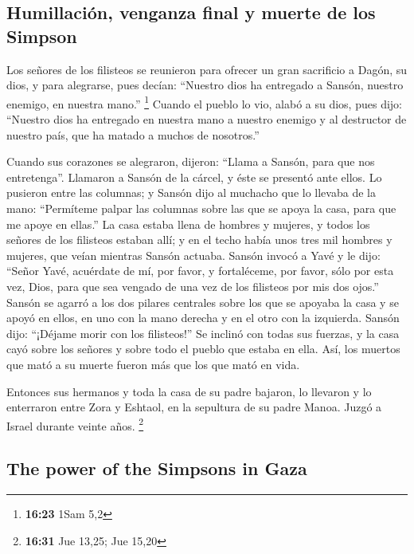 \begin{paracol}{2}
\hypertarget{humillaciuxf3n-venganza-final-y-muerte-de-los-simpson}{%
\subsection{Humillación, venganza final y muerte de los
Simpson}\label{humillaciuxf3n-venganza-final-y-muerte-de-los-simpson}}

 Los señores de los filisteos se reunieron para ofrecer
un gran sacrificio a Dagón, su dios, y para alegrarse, pues decían:
``Nuestro dios ha entregado a Sansón, nuestro enemigo, en nuestra
mano.'' \footnote{\textbf{16:23} 1Sam 5,2}  Cuando el
pueblo lo vio, alabó a su dios, pues dijo: ``Nuestro dios ha entregado
en nuestra mano a nuestro enemigo y al destructor de nuestro país, que
ha matado a muchos de nosotros.''

 Cuando sus corazones se alegraron, dijeron: ``Llama a
Sansón, para que nos entretenga''. Llamaron a Sansón de la cárcel, y
éste se presentó ante ellos. Lo pusieron entre las columnas;
 y Sansón dijo al muchacho que lo llevaba de la mano:
``Permíteme palpar las columnas sobre las que se apoya la casa, para que
me apoye en ellas.''  La casa estaba llena de hombres y
mujeres, y todos los señores de los filisteos estaban allí; y en el
techo había unos tres mil hombres y mujeres, que veían mientras Sansón
actuaba.  Sansón invocó a Yavé y le dijo: ``Señor Yavé,
acuérdate de mí, por favor, y fortaléceme, por favor, sólo por esta vez,
Dios, para que sea vengado de una vez de los filisteos por mis dos
ojos.''  Sansón se agarró a los dos pilares centrales
sobre los que se apoyaba la casa y se apoyó en ellos, en uno con la mano
derecha y en el otro con la izquierda.  Sansón dijo:
``¡Déjame morir con los filisteos!'' Se inclinó con todas sus fuerzas, y
la casa cayó sobre los señores y sobre todo el pueblo que estaba en
ella. Así, los muertos que mató a su muerte fueron más que los que mató
en vida.

 Entonces sus hermanos y toda la casa de su padre
bajaron, lo llevaron y lo enterraron entre Zora y Eshtaol, en la
sepultura de su padre Manoa. Juzgó a Israel durante veinte años.
\footnote{\textbf{16:31} Jue 13,25; Jue 15,20}

\switchcolumn
\begin{otherlanguage}{english}

\hypertarget{the-power-of-the-simpsons-in-gaza}{%
\subsection{The power of the Simpsons in
Gaza}\label{the-power-of-the-simpsons-in-gaza}}


\end{otherlanguage}
\end{paracol}
